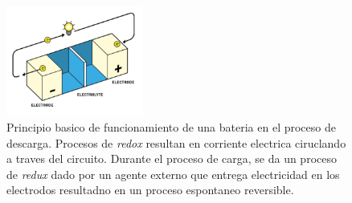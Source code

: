 \documentclass[10pt,a4paper]{article}
\begin{document}
    \begin{figure}[h!]
        \begin{center}
            \includegraphics[width=0.4\textwidth]{batt_func_ppr.png}
        \end{center}
        \caption{Principio basico de funcionamiento de una bateria en el
        proceso de descarga. Procesos de \emph{redox} resultan en corriente
        electrica ciruclando a traves del circuito. Durante el proceso de
        carga, se da un proceso de \emph{redux} dado por un agente externo 
        que entrega electricidad en los electrodos resultadno en un proceso
        espontaneo reversible.}
        \label{batt_wk_ppl}
    \end{figure}

    \clearpage
\end{document}
